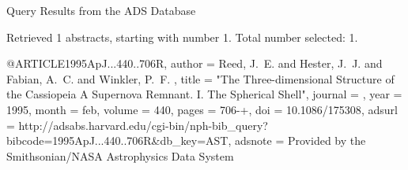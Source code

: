Query Results from the ADS Database


Retrieved 1 abstracts, starting with number 1.  Total number selected: 1.

@ARTICLE{1995ApJ...440..706R,
   author = {{Reed}, J.~E. and {Hester}, J.~J. and {Fabian}, A.~C. and {Winkler}, P.~F.
	},
    title = "{The Three-dimensional Structure of the Cassiopeia A Supernova Remnant. I. The Spherical Shell}",
  journal = {\apj},
     year = 1995,
    month = feb,
   volume = 440,
    pages = {706-+},
      doi = {10.1086/175308},
   adsurl = {http://adsabs.harvard.edu/cgi-bin/nph-bib_query?bibcode=1995ApJ...440..706R&db_key=AST},
  adsnote = {Provided by the Smithsonian/NASA Astrophysics Data System}
}


